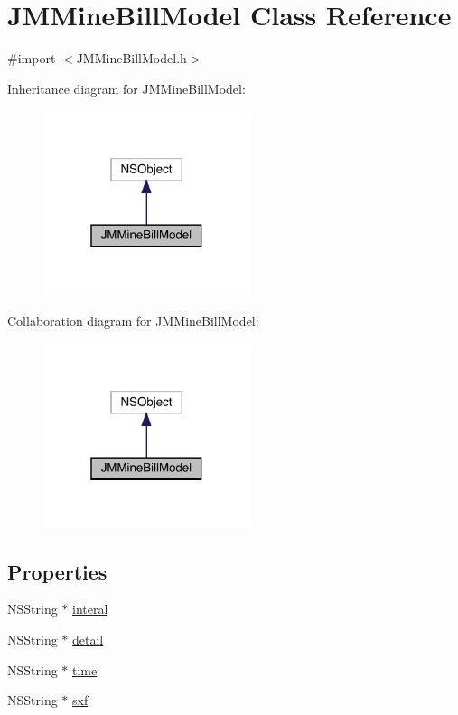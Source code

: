 \hypertarget{interface_j_m_mine_bill_model}{}\section{J\+M\+Mine\+Bill\+Model Class Reference}
\label{interface_j_m_mine_bill_model}


{\ttfamily \#import $<$J\+M\+Mine\+Bill\+Model.\+h$>$}



Inheritance diagram for J\+M\+Mine\+Bill\+Model\+:\nopagebreak
\begin{figure}[H]
\begin{center}
\leavevmode
\includegraphics[width=172pt]{interface_j_m_mine_bill_model__inherit__graph}
\end{center}
\end{figure}


Collaboration diagram for J\+M\+Mine\+Bill\+Model\+:\nopagebreak
\begin{figure}[H]
\begin{center}
\leavevmode
\includegraphics[width=172pt]{interface_j_m_mine_bill_model__coll__graph}
\end{center}
\end{figure}
\subsection*{Properties}
\begin{DoxyCompactItemize}
\item 
N\+S\+String $\ast$ \mbox{\hyperlink{interface_j_m_mine_bill_model_a319767bd908618f8590abe0ef984b839}{interal}}
\item 
N\+S\+String $\ast$ \mbox{\hyperlink{interface_j_m_mine_bill_model_a80fc8faab25ffd419df437d38ae59609}{detail}}
\item 
N\+S\+String $\ast$ \mbox{\hyperlink{interface_j_m_mine_bill_model_a7dc28bbb1c308f64bb827b6eb770b2cf}{time}}
\item 
N\+S\+String $\ast$ \mbox{\hyperlink{interface_j_m_mine_bill_model_abc1e09aaf5519e3d2abaeda3b1d40e8c}{sxf}}
\end{DoxyCompactItemize}


